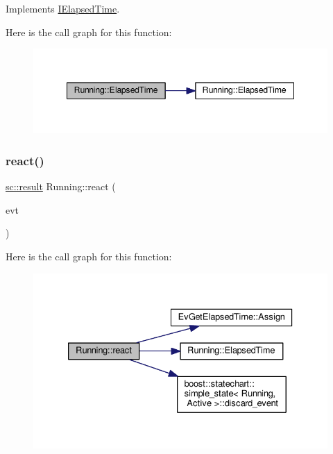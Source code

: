 Implements \mbox{\hyperlink{struct_i_elapsed_time_a11995710009caacf4343d6d0f79da4ce}{I\+Elapsed\+Time}}.

Here is the call graph for this function\+:
\nopagebreak
\begin{figure}[H]
\begin{center}
\leavevmode
\includegraphics[width=348pt]{struct_running_a5320a8463f61e5ab96008bc218bb9f68_cgraph}
\end{center}
\end{figure}
\mbox{\label{struct_running_ac2b99d336186c859e4425556619567fa}} 
\subsubsection{\texorpdfstring{react()}{react()}}
{\footnotesize\ttfamily \mbox{\hyperlink{namespaceboost_1_1statechart_abe807f6598b614d6d87bb951ecd92331}{sc\+::result}} Running\+::react (\begin{DoxyParamCaption}\item[{const \mbox{\hyperlink{struct_ev_get_elapsed_time}{Ev\+Get\+Elapsed\+Time}} \&}]{evt }\end{DoxyParamCaption})\hspace{0.3cm}{\ttfamily [inline]}}

Here is the call graph for this function\+:
\nopagebreak
\begin{figure}[H]
\begin{center}
\leavevmode
\includegraphics[width=333pt]{struct_running_ac2b99d336186c859e4425556619567fa_cgraph}
\end{center}
\end{figure}


